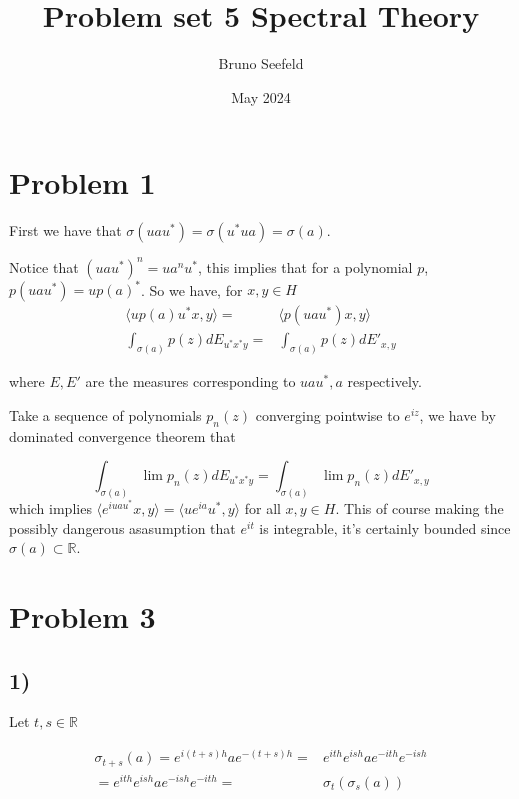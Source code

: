 \documentclass{article}
\title{Problem set 5 Spectral Theory}
\author{Bruno Seefeld}
\date{May 2024}
\begin{document}
\maketitle


\section*{Problem 1}

First we have that $\sigma(uau^\ast)=\sigma(u^\ast ua)=\sigma(a)$.

Notice that $(uau^\ast)^n=ua^nu^\ast$, this implies that for a polynomial 
$p$, $p(uau^\ast)=up(a)^\ast$. So we have, for $x,y\in H$
\begin{align}
    \langle up(a)u^\ast x,y \rangle=&\langle p(uau^\ast )x,y \rangle\\
    \int_{\sigma(a)}p(z) dE_{u^\ast x^\ast y}=&\int_{\sigma(a)}p(z) dE'_{x,y}  
\end{align}

where $E,E'$ are the measures corresponding to $uau^\ast, a$ respectively.

Take a sequence of polynomials $p_n(z)$ converging pointwise to $e^{iz}$, we
have by dominated convergence theorem that 

\begin{equation}
    \int_{\sigma(a)} \lim p_n(z) dE_{u^\ast x^\ast y}=\int_{\sigma(a)}\lim p_n(z) dE'_{x,y} 
\end{equation}
which implies $\langle e^{iuau^\ast}x, y\rangle =\langle ue^{ia}u^\ast,y\rangle$ 
for all $x,y\in H$.
This of course making the possibly dangerous asasumption that $e^{it}$ is integrable,
it's certainly bounded since $\sigma(a)\subset \mathbb{R}$.




\section*{Problem 3}

\subsection*{1)}

Let $t,s\in \mathbb{R}$

\begin{align*}
    \sigma_{t+s}(a)=e^{i(t+s)h}ae^{-(t+s)h}=& e^{ith}e^{ish}ae^{-ith}e^{-ish}\\
    =e^{ith}e^{ish}ae^{-ish}e^{-ith}=&\sigma_{t}(\sigma_s (a))
\end{align*}
\end{document}
